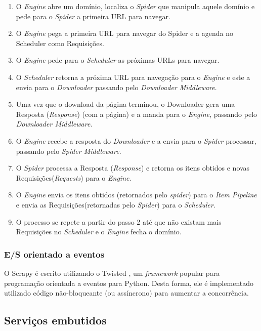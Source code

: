 \begin{enumerate}
	\item O \emph{Engine} abre um domínio, localiza o \emph{Spider} que manipula aquele domínio e pede para o \emph{Spider} a primeira URL para navegar.
	\item O \emph{Engine} pega a primeira URL para navegar do Spider e a agenda no Scheduler como Requisições.
	\item O \emph{Engine} pede para o \emph{Scheduler} as próximas URLs para navegar.
	\item O \emph{Scheduler} retorna a próxima URL para navegação para o \emph{Engine} e este a envia para o \emph{Downloader} passando pelo \emph{Downloader Middleware}.
	\item Uma vez que o download da página terminou, o Downloader gera uma Resposta (\emph{Response}) (com a página) e a manda para o \emph{Engine}, passando pelo \emph{Downloader Middleware}.
	\item O \textit{Engine} recebe a resposta do \textit{Downloader} e a envia para o \textit{Spider} processar, passando pelo \textit{Spider Middleware}.
	\item O \textit{Spider} processa a Resposta (\textit{Response}) e retorna os itens obtidos e novas Requisições(\textit{Requests}) para o \textit{Engine}.
	\item O \textit{Engine} envia os itens obtidos (retornados pelo \textit{spider}) para o \textit{Item Pipeline} e envia as Requisições(retornadas pelo \textit{Spider}) para o \textit{Scheduler}.
	\item O processo se repete a partir do passo 2 até que não existam mais Requisições no \textit{Scheduler} e o \textit{Engine} fecha o domínio.
\end{enumerate}

\subsubsection{E/S orientado a eventos}

O Scrapy é escrito utilizando o Twisted \cite{twisted}, um \textit{framework} popular para programação orientada a eventos para Python. Desta forma, ele é implementado utilizado código não-bloqueante (ou assíncrono) para aumentar a concorrência.

\subsection{Serviços embutidos}

